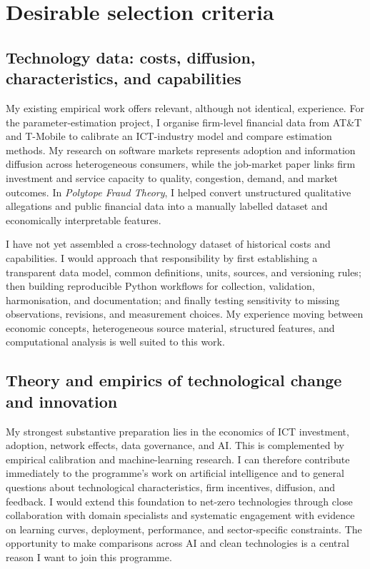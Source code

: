 \documentclass{nfr}
\begin{document}
\section*{Desirable selection criteria}

\subsection*{Technology data: costs, diffusion, characteristics, and capabilities}

My existing empirical work offers relevant, although not identical, experience. For the parameter-estimation project, I organise firm-level financial data from AT\&T and T-Mobile to calibrate an ICT-industry model and compare estimation methods. My research on software markets represents adoption and information diffusion across heterogeneous consumers, while the job-market paper links firm investment and service capacity to quality, congestion, demand, and market outcomes. In \textit{Polytope Fraud Theory}, I helped convert unstructured qualitative allegations and public financial data into a manually labelled dataset and economically interpretable features.

I have not yet assembled a cross-technology dataset of historical costs and capabilities. I would approach that responsibility by first establishing a transparent data model, common definitions, units, sources, and versioning rules; then building reproducible Python workflows for collection, validation, harmonisation, and documentation; and finally testing sensitivity to missing observations, revisions, and measurement choices. My experience moving between economic concepts, heterogeneous source material, structured features, and computational analysis is well suited to this work.

\subsection*{Theory and empirics of technological change and innovation}

My strongest substantive preparation lies in the economics of ICT investment, adoption, network effects, data governance, and AI. This is complemented by empirical calibration and machine-learning research. I can therefore contribute immediately to the programme's work on artificial intelligence and to general questions about technological characteristics, firm incentives, diffusion, and feedback. I would extend this foundation to net-zero technologies through close collaboration with domain specialists and systematic engagement with evidence on learning curves, deployment, performance, and sector-specific constraints. The opportunity to make comparisons across AI and clean technologies is a central reason I want to join this programme.
\end{document}
